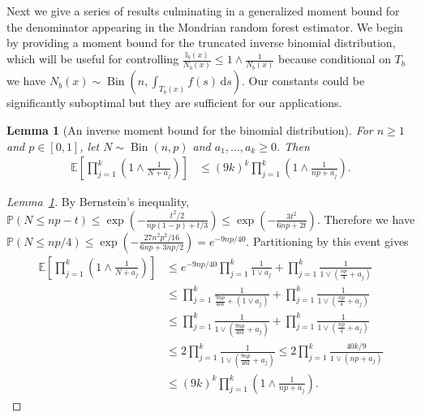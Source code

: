 \documentclass[11pt,lof]{puthesis}
\renewcommand{\P}{\ensuremath{\mathbb{P}}}
\newcommand{\E}{\ensuremath{\mathbb{E}}}
\newcommand{\I}{\ensuremath{\mathbb{I}}}
\DeclareMathOperator{\Bin}{Bin}
\newcommand{\diff}[1]{\,\mathrm{d}#1}
\theoremstyle{break}
\newtheorem{lemma}{Lemma}[section]
\theoremstyle{proof}
\newtheorem{proof}{Proof}
\begin{document}
Next we give a series of results culminating in a
generalized moment bound for the denominator appearing
in the Mondrian random forest estimator.
We begin by providing a moment bound for the truncated inverse binomial
distribution, which will be useful for controlling
$\frac{\I_b(x)}{N_b(x)} \leq 1 \wedge \frac{1}{N_b(x)}$
because conditional on $T_b$ we have
$N_b(x) \sim \Bin \left( n, \int_{T_b(x)} f(s) \diff s \right)$.
Our constants could be significantly suboptimal but they are sufficient
for our applications.

\begin{lemma}[An inverse moment bound for the binomial distribution]%
  \label{lem:mondrian_app_binomial_bound}
  For $n \geq 1$ and $p \in [0,1]$,
  let $N \sim \Bin(n, p)$ and $a_1, \ldots, a_k \geq 0$.
  Then
  \begin{align*}
    \E\left[
      \prod_{j=1}^k
      \left(
        1 \wedge
        \frac{1}{N + a_j}
      \right)
    \right]
    &\leq
    (9k)^k
    \prod_{j=1}^k
    \left(
      1 \wedge
      \frac{1}{n p + a_j}
    \right).
  \end{align*}
\end{lemma}

\begin{proof}[Lemma~\ref{lem:mondrian_app_binomial_bound}]
  By Bernstein's inequality,
  $\P\left( N \leq n p - t \right)
  \leq \exp\left(-\frac{t^2/2}{n p(1-p) + t/3}\right)
  \leq \exp\left(-\frac{3t^2}{6n p + 2t}\right)$.
  Therefore we have
  $\P\left( N \leq n p/4 \right)
  \leq \exp\left(-\frac{27 n^2 p^2 / 16}{6n p + 3 n p / 2}\right)
  = e^{-9 n p / 40}$.
  Partitioning by this event gives
  \begin{align*}
    \E\left[
      \prod_{j=1}^k
      \left(
        1 \wedge
        \frac{1}{N + a_j}
      \right)
    \right]
    &\leq
    e^{-9 n p / 40}
    \prod_{j=1}^k
    \frac{1}{1 \vee a_j}
    + \prod_{j=1}^k
    \frac{1}{1 \vee (\frac{n p}{4} + a_j)} \\
    &\leq
    \prod_{j=1}^k
    \frac{1}{\frac{9 n p}{40k} + (1 \vee a_j)}
    + \prod_{j=1}^k
    \frac{1}{1 \vee (\frac{n p}{4} + a_j)} \\
    &\leq
    \prod_{j=1}^k
    \frac{1}{1 \vee \left(\frac{9 n p}{40k} + a_j\right)}
    + \prod_{j=1}^k
    \frac{1}{1 \vee (\frac{n p}{4} + a_j)} \\
    &\leq
    2 \prod_{j=1}^k
    \frac{1}{1 \vee \left(\frac{9 n p}{40k} + a_j\right)}
    \leq
    2 \prod_{j=1}^k
    \frac{40k/9}{1 \vee \left(n p + a_j\right)} \\
    &\leq
    (9k)^k
    \prod_{j=1}^k
    \left(
      1 \wedge
      \frac{1}{n p + a_j}
    \right).
  \end{align*}
\end{proof}
\end{document}
